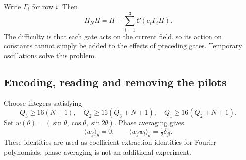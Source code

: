 \documentclass[11pt,a4paper]{amsart}
\theoremstyle{definition}
\theoremstyle{remark}
\numberwithin{equation}{section}
\begin{document}
Write $\Gamma_i$ for row $i$. Then
\begin{equation}\label{eq:rowpotential}
 \Pi_NH=H+\sum_{i=1}^3\mathscr C(e_i\Gamma_iH).
\end{equation}
The difficulty is that each gate acts on the current field, so its action
on constants cannot simply be added to the effects of preceding gates.
Temporary oscillations solve this problem.

\subsection{Encoding, reading and removing the pilots}
Choose integers satisfying
\begin{equation}\label{eq:separation}
 Q_3\ge16(N+1),\quad Q_2\ge16(Q_3+N+1),\quad
 Q_1\ge16(Q_2+N+1).
\end{equation}
Set $w(\theta)=(\sin\theta,\cos\theta,\sin2\theta)$. Phase averaging gives
\begin{equation}\label{eq:gram}
 \langle w_j\rangle_\theta=0,\qquad
 \langle w_jw_l\rangle_\theta=\tfrac12\delta_{jl}.
\end{equation}
These identities are used as coefficient-extraction identities for Fourier
polynomials; phase averaging is not an additional experiment.
\end{document}
